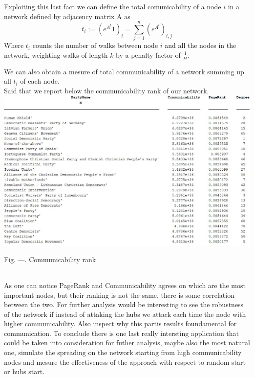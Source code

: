 \documentclass{article}%
\begin{document}
Exploiting this last fact we can define the total comunicability of a node $i$ in a network defined by adjacency matrix A as
\[ t_i:=(e^{A^t}1)_i=\sum_{j=1}^n (e^{A^t})_{i,j}
\]
Where $t_i$ counts the number of walks between node $i$ and all the nodes in the network, weighting walks of length $k$ by a penalty factor of $\frac{1}{k!}$.


We can also obtain a mesure of total communicability of a network summing up all $t_i$ of each node.
\\

Said that we report below the communicability rank of our network.
\\

\includegraphics[scale=0.6]{communicability}
\begin{center}
\begin{small}
Fig. ---. Communicability rank 
\end{small}
\end{center}
~
\\
As one can notice PageRank and Communicability agrees on which are the most important nodes, but their ranking is not the same, there is some correlation between the two.
For further analysis would be interesting to see the robustness of the network if instead of attaking the hubs we attack each time the node with higher communicability. Also inspect why this partis results foundamental for communication.
To conclude there is one last really intersting application that could be taken into consideration for futher analysis, maybe also the most natural one, simulate the spreading on the network starting from high communicability nodes and mesure the effectiveness of the approach with respect to random start or hubs start.
\end{document}
